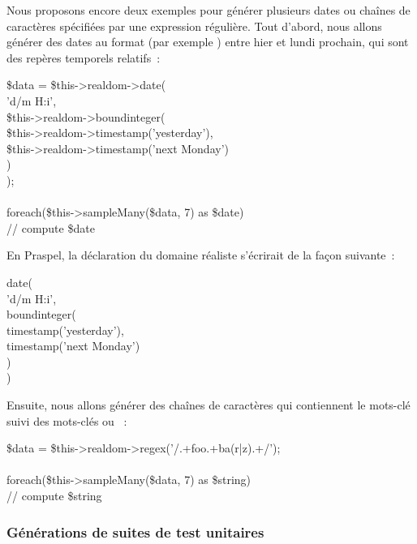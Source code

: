 \begin{example}

Nous proposons encore deux exemples pour générer plusieurs dates ou chaînes de
caractères spécifiées par une expression régulière. Tout d'abord, nous allons
générer des dates au format  (par exemple )
entre hier et lundi prochain, qui sont des repères temporels relatifs~:

%
\begin{pre}
\$data = \$this->realdom->date( \\
    'd/m H:i', \\
    \$this->realdom->boundinteger( \\
        \$this->realdom->timestamp('yesterday'), \\
        \$this->realdom->timestamp('next Monday') \\
    ) \\
); \\
 \\
foreach(\$this->sampleMany(\$data, 7) as \$date) \\
    // compute \$date
\end{pre}
%
En Praspel, la déclaration du domaine réaliste s'écrirait de la façon suivante~:
%
\begin{pre}
date( \\
    'd/m H:i', \\
    boundinteger( \\
        timestamp('yesterday'), \\
        timestamp('next Monday') \\
    ) \\
)
\end{pre}
%
Ensuite, nous allons générer des chaînes de caractères qui contiennent
le mots-clé  suivi des mots-clés  ou ~:
%
\begin{pre}
\$data = \$this->realdom->regex('/.+foo.+ba(r|z).+/'); \\
 \\
foreach(\$this->sampleMany(\$data, 7) as \$string) \\
    // compute \$string
\end{pre}

\end{example}

\subsubsection{Générations de suites de test unitaires}

